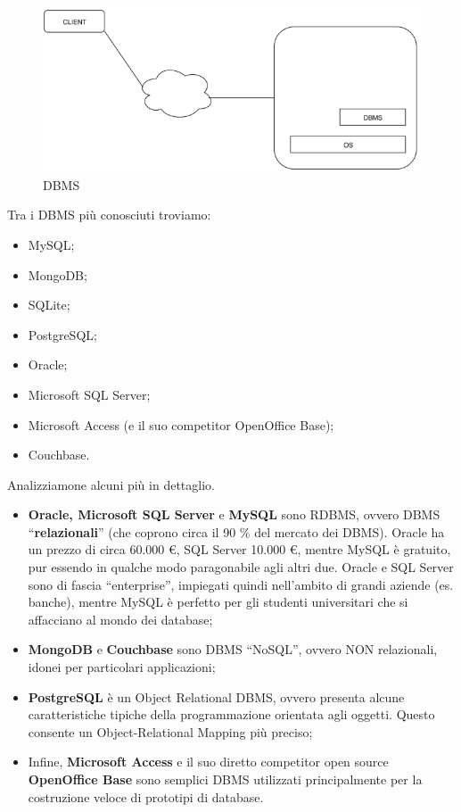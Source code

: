 \begin{center}
\begin{figure}[H]
\centering
\includegraphics[scale=0.8]{figures/DBMS.png}
\caption{DBMS}
\end{figure}
\end{center}

Tra i DBMS più conosciuti troviamo:  

\begin{itemize}

\item MySQL;
\item MongoDB;
\item SQLite;
\item PostgreSQL;
\item Oracle;
\item Microsoft SQL Server;
\item Microsoft Access (e il suo competitor OpenOffice Base);
\item Couchbase.

\end{itemize}

Analizziamone alcuni più in dettaglio. 

\begin{itemize}

\item{\textbf{Oracle, Microsoft SQL Server} e \textbf{MySQL}} sono RDBMS, ovvero DBMS “\textbf{relazionali}” (che coprono circa il 90 \% del mercato dei DBMS). Oracle ha un prezzo di circa 60.000 €, SQL Server 10.000 €, mentre MySQL è gratuito, pur essendo in qualche modo paragonabile agli altri due. Oracle e SQL Server sono di fascia “enterprise”, impiegati quindi nell’ambito di grandi aziende (es. banche), mentre MySQL è perfetto per gli studenti universitari che si affacciano al mondo dei database;

\item{\textbf{MongoDB} e \textbf{Couchbase}} sono DBMS “NoSQL”, ovvero NON relazionali, idonei per particolari applicazioni;

\item{\textbf{PostgreSQL}} è un Object Relational DBMS, ovvero presenta alcune caratteristiche tipiche della programmazione orientata agli oggetti. Questo consente un Object-Relational Mapping più preciso;

\item Infine, \textbf{Microsoft Access} e il suo diretto competitor open source \textbf{OpenOffice Base} sono semplici DBMS utilizzati principalmente per la costruzione veloce di prototipi di database.

\end{itemize}


